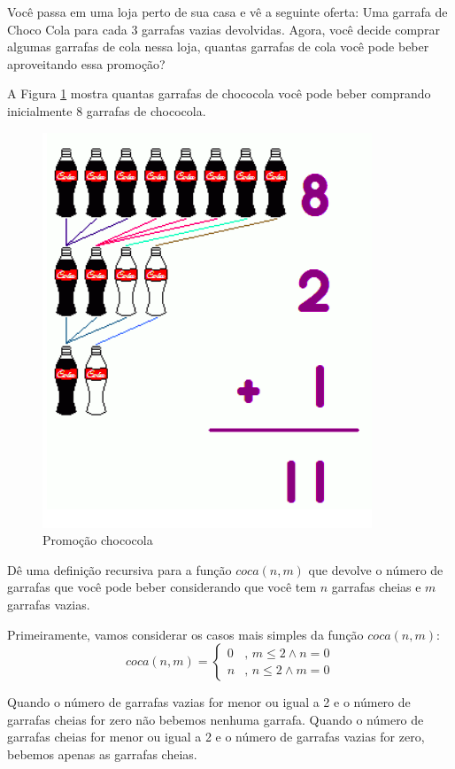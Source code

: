 \begin{exemplo}
Você passa em uma loja perto de sua casa e vê a seguinte oferta: Uma garrafa de Choco Cola para cada 3 garrafas vazias devolvidas. Agora, você decide comprar algumas garrafas de cola nessa loja, quantas garrafas de cola você pode beber aproveitando essa promoção?

A Figura \ref{fig::chococola} mostra quantas garrafas de chococola você pode beber comprando inicialmente 8 garrafas de chococola.


\begin{figure}[!htbp]
\caption{Promoção chococola}
\label{fig::chococola}
\begin{center}
\includegraphics[scale=0.6]{images/cola.png} 
\end{center}
\end{figure}

Dê uma definição recursiva para a função $coca(n,m)$ que devolve o número de garrafas que você pode beber considerando que você tem $n$ garrafas cheias e $m$ garrafas vazias.



Primeiramente, vamos considerar os casos mais simples da função $coca(n,m)$:
$$coca(n,m) = 
\begin{cases}
0 & \text{, $m \leq 2 \wedge n = 0$}\\
n & \text{, $n \leq 2 \wedge m = 0$} 
\end{cases}
$$

Quando o número de garrafas vazias for menor ou igual a 2 e o número de garrafas cheias for zero não bebemos nenhuma garrafa. Quando o número de garrafas cheias for menor ou igual a 2 e o número de garrafas vazias for zero, bebemos apenas as garrafas cheias. 


\end{exemplo}
